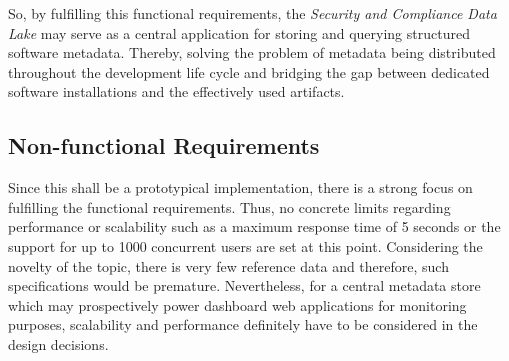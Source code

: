 So, by fulfilling this functional requirements, the \emph{Security and Compliance Data Lake} may serve as a central application for storing and querying structured software metadata. Thereby, solving the problem of metadata being distributed throughout the development life cycle and bridging the gap between dedicated software installations and the effectively used artifacts.

\subsection{Non-functional Requirements} \label{sec:Non-functional Requirements}
Since this shall be a prototypical implementation, there is a strong focus on fulfilling the functional requirements. Thus, no concrete limits regarding performance or scalability such as a maximum response time of 5 seconds or the support for up to 1000 concurrent users are set at this point. Considering the novelty of the topic, there is very few reference data and therefore, such specifications would be premature. Nevertheless, for a central metadata store which may prospectively power dashboard web applications for monitoring purposes, scalability and performance definitely have to be considered in the design decisions.

